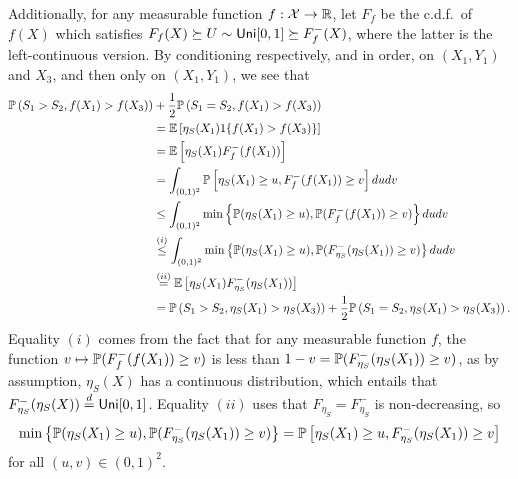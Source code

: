Additionally,  for any measurable function $f : \mc{X} \to \R$,  let $F_f$ be the c.d.f.\ of $f(X)$  which satisfies $F_f(X) \succeq U \sim \uniform[0,1] \succeq F_f^{-}(X)$, where the latter is the left-continuous version.
By conditioning respectively, and in order,
on $(X_1,Y_1)$ and $X_3$, and then only on $(X_1, Y_1)$,  we see that
\begin{align*}
\P\left( \scorerv_1 > \scorerv_2 , f(X_1) > f(X_3) \right) &+ \half \P\left( \scorerv_1 = \scorerv_2 , f(X_1) > f(X_3) \right) \\
&= \E\left[ \eta_S(X_1) \indic{ f(X_1) > f(X_3) } \right] \\
&= \E\left[ \eta_S(X_1) F_f^{-}(f(X_1)) \right]  \\
&= \int_{(0,1)^2} \P\left[ \eta_S(X_1) \ge u,  F_f^{-}(f(X_1)) \ge v \right] du dv \\
&\le \int_{(0,1)^2}  \min \left\{ \P(\eta_S(X_1) \ge u),  \P(F_f^{-}(f(X_1)) \ge v) \right\} du dv \\
&\overset{(i)}{\le} \int_{(0,1)^2}  \min \left\{ \P(\eta_S(X_1) \ge u),  \P(F_{\eta_S}^{-}(\eta_S(X_1)) \ge v) \right\} du dv \\
&\overset{(ii)}{=} \E\left[ \eta_S(X_1) F_{\eta_S}^{-}(\eta_S(X_1)) \right] \\
&= \P\left( \scorerv_1 > \scorerv_2 , \eta_S(X_1) > \eta_S(X_3) \right) +  \half \P\left( \scorerv_1 = \scorerv_2 , \eta_S(X_1) > \eta_S(X_3) \right).
\end{align*}
Equality $(i)$ comes from the fact that for any measurable function $f$, the
function $v \mapsto \P(F_f^{-}(f(X_1)) \ge v)$ is less than $1-v =
\P(F_{\eta_S}^{-}(\eta_S(X_1)) \ge v)$, as by assumption, $\eta_S(X)$ has a
continuous distribution, which entails that $F_{\eta_S}^{-}(\eta_S(X))
\overset{d}{=} \uniform[0,1]$.  Equality $(ii)$ uses that $F_{\eta_S} =
F_{\eta_S}^-$ is non-decreasing, so
\begin{align*}
\min \left\{ \P(\eta_S(X_1) \ge u),  \P(F_{\eta_S}^{-}(\eta_S(X_1)) \ge v) \right\} =
\P\left[ \eta_S(X_1) \ge u,  F_{\eta_S}^{-}(\eta_S(X_1)) \ge v \right]
\end{align*}
for all $(u,v) \in (0,1)^2$.
 
